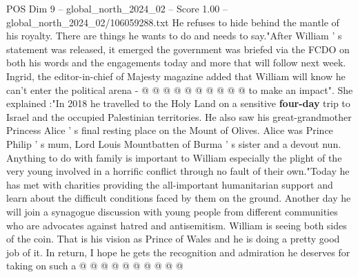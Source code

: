 \begin{textsample}{POS Dim 9 – global\_north\_2024\_02 – Score 1.00 – global\_north\_2024\_02/106059288.txt}
He refuses to hide behind the mantle of his royalty.
There are things he wants to do and needs to say."After William ' s statement was released, it emerged the government was briefed via the FCDO on both his words and the engagements today and more that will follow next week.
Ingrid, the editor-in-chief of Majesty magazine added that William will know he can't enter the political arena - @ @ @ @ @ @ @ @ @ @ to make an impact".
She explained :"In 2018 he travelled to the Holy Land on a sensitive \textbf{four-day} trip to Israel and the occupied Palestinian territories.
He also saw his great-grandmother Princess Alice ' s final resting place on the Mount of Olives.
Alice was Prince Philip ' s mum, Lord Louis Mountbatten of Burma ' s sister and a devout nun.
Anything to do with family is important to William especially the plight of the very young involved in a horrific conflict through no fault of their own."Today he has met with charities providing the all-important humanitarian support and learn about the difficult conditions faced by them on the ground.
Another day he will join a synagogue discussion with young people from different communities who are advocates against hatred and antisemitism.
William is seeing both sides of the coin.
That is his vision as Prince of Wales and he is doing a pretty good job of it.
In return, I hope he gets the recognition and admiration he deserves for taking on such a @ @ @ @ @ @ @ @ @ @

\end{textsample}
